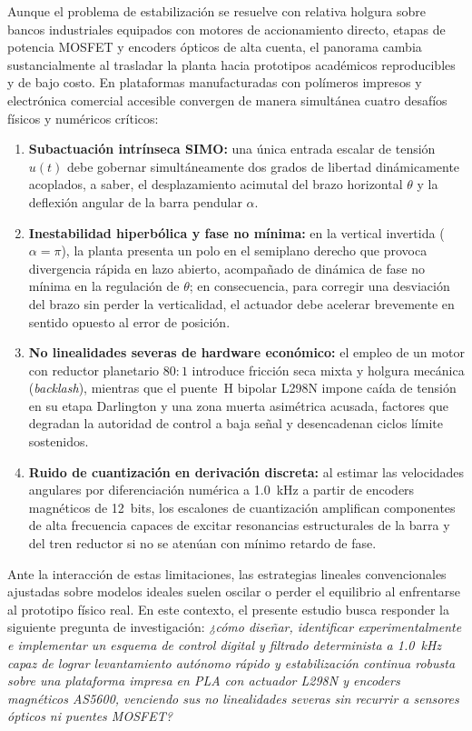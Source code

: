 Aunque el problema de estabilización se resuelve con relativa holgura sobre bancos industriales equipados con motores de accionamiento directo, etapas de potencia MOSFET y encoders ópticos de alta cuenta, el panorama cambia sustancialmente al trasladar la planta hacia prototipos académicos reproducibles y de bajo costo. En plataformas manufacturadas con polímeros impresos y electrónica comercial accesible convergen de manera simultánea cuatro desafíos físicos y numéricos críticos:
\begin{enumerate}
    \item \textbf{Subactuación intrínseca SIMO:} una única entrada escalar de tensión $u(t)$ debe gobernar simultáneamente dos grados de libertad dinámicamente acoplados, a saber, el desplazamiento acimutal del brazo horizontal $\theta$ y la deflexión angular de la barra pendular $\alpha$.
    \item \textbf{Inestabilidad hiperbólica y fase no mínima:} en la vertical invertida ($\alpha = \pi$), la planta presenta un polo en el semiplano derecho que provoca divergencia rápida en lazo abierto, acompañado de dinámica de fase no mínima en la regulación de $\theta$; en consecuencia, para corregir una desviación del brazo sin perder la verticalidad, el actuador debe acelerar brevemente en sentido opuesto al error de posición.
    \item \textbf{No linealidades severas de hardware económico:} el empleo de un motor con reductor planetario $80:1$ introduce fricción seca mixta y holgura mecánica (\textit{backlash}), mientras que el puente~H bipolar L298N impone caída de tensión en su etapa Darlington y una zona muerta asimétrica acusada, factores que degradan la autoridad de control a baja señal y desencadenan ciclos límite sostenidos.
    \item \textbf{Ruido de cuantización en derivación discreta:} al estimar las velocidades angulares por diferenciación numérica a \qty{1.0}{\kilo\hertz} a partir de encoders magnéticos de 12~bits, los escalones de cuantización amplifican componentes de alta frecuencia capaces de excitar resonancias estructurales de la barra y del tren reductor si no se atenúan con mínimo retardo de fase.
\end{enumerate}

Ante la interacción de estas limitaciones, las estrategias lineales convencionales ajustadas sobre modelos ideales suelen oscilar o perder el equilibrio al enfrentarse al prototipo físico real. En este contexto, el presente estudio busca responder la siguiente pregunta de investigación: \textit{¿cómo diseñar, identificar experimentalmente e implementar un esquema de control digital y filtrado determinista a \qty{1.0}{\kilo\hertz} capaz de lograr levantamiento autónomo rápido y estabilización continua robusta sobre una plataforma impresa en PLA con actuador L298N y encoders magnéticos AS5600, venciendo sus no linealidades severas sin recurrir a sensores ópticos ni puentes MOSFET?}

